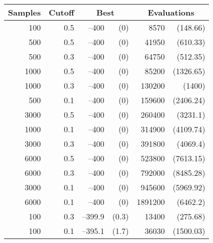 
\begin{table}[tbp]
\centering
\caption{}
\begin{tabular}{|r|r|rr|rr|}
\hline
\multicolumn{1}{|c|}{Samples} & \multicolumn{1}{c|}{Cutoff} &
 \multicolumn{2}{c|}{Best} & 
 \multicolumn{2}{c|}{Evaluations}  \\ \hline
100 & 0.5 & --400 &  (0) & 8570 & (148.66) \\ \hline
500 & 0.5 & --400 &  (0) & 41950 &  (610.33) \\ \hline
500 & 0.3 & --400 &  (0) & 64750 &  (512.35) \\ \hline
1000 & 0.5 & --400 &  (0) & 85200 &  (1326.65) \\ \hline
1000 & 0.3 & --400 &  (0) & 130200 &  (1400) \\ \hline
500 & 0.1 & --400 &  (0) & 159600 &  (2406.24) \\ \hline
3000 & 0.5 & --400 &  (0) & 260400 &  (3231.1) \\ \hline
1000 & 0.1 & --400 &  (0) & 314900 &  (4109.74) \\ \hline
3000 & 0.3 & --400 &  (0) & 391800 &  (4069.4) \\ \hline
6000 & 0.5 & --400 &  (0) & 523800 &  (7613.15) \\ \hline
6000 & 0.3 & --400 &  (0) & 792000 &  (8485.28) \\ \hline
3000 & 0.1 & --400 &  (0) & 945600 &  (5969.92) \\ \hline
6000 & 0.1 & --400 &  (0) & 1891200 &  (6462.2) \\ \hline
100 & 0.3 & --399.9 &  (0.3) & 13400 &  (275.68) \\ \hline
100 & 0.1 & --395.1 &  (1.7) & 36030 &  (1500.03) \\ \hline
\end{tabular}
\label{ann-onemax}
\end{table}

